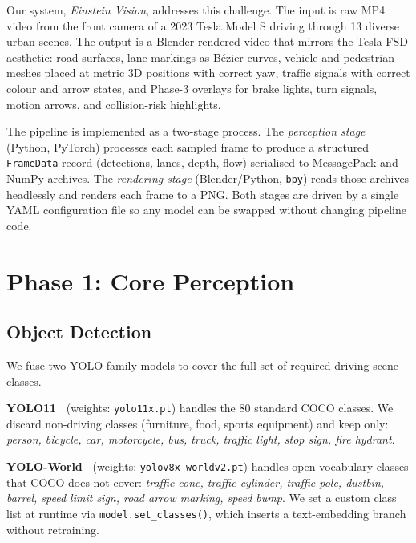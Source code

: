 \documentclass[conference]{IEEEtran}
\begin{document}
Our system, \emph{Einstein Vision}, addresses this challenge.  The input is
raw MP4 video from the front camera of a 2023 Tesla Model S driving through
13 diverse urban scenes.  The output is a Blender-rendered video that mirrors
the Tesla FSD aesthetic: road surfaces, lane markings as B\'ezier curves,
vehicle and pedestrian meshes placed at metric 3D positions with correct yaw,
traffic signals with correct colour and arrow states, and Phase-3 overlays for
brake lights, turn signals, motion arrows, and collision-risk highlights.

The pipeline is implemented as a two-stage process.  The \emph{perception
stage} (Python, PyTorch) processes each sampled frame to produce a structured
\texttt{FrameData} record (detections, lanes, depth, flow) serialised to
MessagePack and NumPy archives.  The \emph{rendering stage} (Blender/Python,
\texttt{bpy}) reads those archives headlessly and renders each frame to a PNG.
Both stages are driven by a single YAML configuration file so any model can be
swapped without changing pipeline code.

\section{Phase 1: Core Perception}

\subsection{Object Detection}

We fuse two YOLO-family models to cover the full set of required
driving-scene classes.

\textbf{YOLO11~\cite{ultralytics2024yolo11}} (weights: \texttt{yolo11x.pt})
handles the 80 standard COCO classes.  We discard non-driving classes
(furniture, food, sports equipment) and keep only:
\emph{person, bicycle, car, motorcycle, bus, truck, traffic light, stop sign,
fire hydrant}.

\textbf{YOLO-World~\cite{cheng2024yoloworld}} (weights:
\texttt{yolov8x-worldv2.pt}) handles open-vocabulary classes that COCO does
not cover: \emph{traffic cone, traffic cylinder, traffic pole, dustbin,
barrel, speed limit sign, road arrow marking, speed bump}.  We set a
custom class list at runtime via \texttt{model.set\_classes()}, which
inserts a text-embedding branch without retraining.
\end{document}
